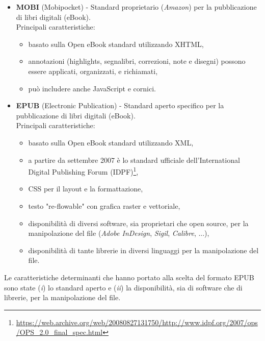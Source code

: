 \begin{itemize}
    \item \textbf{MOBI} (Mobipocket) - Standard proprietario (\textit{Amazon}) per la pubblicazione di libri digitali (eBook).\\
    Principali caratteristiche:
    \begin{itemize}
        \item basato sulla Open eBook standard utilizzando XHTML,
        \item annotazioni (highlights, segnalibri, correzioni, note e disegni) possono essere applicati, organizzati, e richiamati,
        \item può includere anche JavaScript e cornici.
    \end{itemize}
    \item \textbf{EPUB} (Electronic Publication) - Standard aperto specifico per la pubblicazione di libri digitali (eBook).\\
    Principali caratteristiche:
    \begin{itemize}
        \item basato sulla Open eBook standard utilizzando XML,
        \item a partire da settembre 2007 è lo standard ufficiale dell'International Digital Publishing Forum (IDPF)\footnote{\url{https://web.archive.org/web/20080827131750/http://www.idpf.org/2007/ops/OPS_2.0_final_spec.html}},
        \item CSS per il layout e la formattazione,
        \item testo "re-flowable" con grafica raster e vettoriale,
        \item disponibilità di diversi software, sia proprietari che open source, per la manipolazione del file (\textit{Adobe InDesign}, \textit{Sigil}, \textit{Calibre}, ...),
        \item disponibilità di tante librerie in diversi linguaggi per la manipolazione del file.
    \end{itemize}
\end{itemize}
Le caratteristiche determinanti che hanno portato alla scelta del formato EPUB sono state (\textit{i}) lo standard aperto e (\textit{ii}) la disponibilità, sia di software che di librerie, per la manipolazione del file. 

